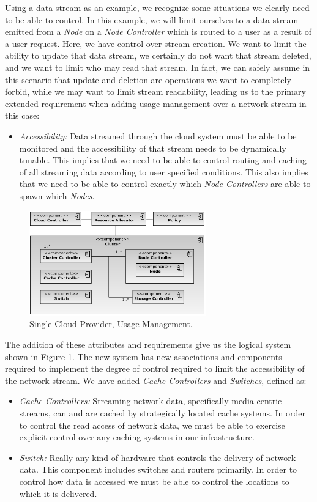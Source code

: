 \documentclass[10pt,letterpaper]{book}
\begin{document}
Using a data stream as an example, we recognize some situations we clearly need to be able to control.  In this example, we will limit ourselves to a data stream emitted from a \textit{Node} on a \textit{Node Controller} which is routed to a user as a result of a user request.  Here, we have control over stream creation.  We want to limit the ability to update that data stream, we certainly do not want that stream deleted, and we want to limit who may read that stream.  In fact, we can safely assume in this scenario that update and deletion are operations we want to completely forbid, while we may want to limit stream readability, leading us to the primary extended requirement when adding usage management over a network stream in this case:

\begin{itemize}
\item \textit{Accessibility:} Data streamed through the cloud system must be able to be monitored and the accessibility of that stream needs to be dynamically tunable.  This implies that we need to be able to control routing and caching of all streaming data according to user specified conditions.  This also implies that we need to be able to control exactly which \textit{Node Controllers} are able to spawn which \textit{Nodes}.
\end{itemize}

\begin{figure}[!t]
\centering
\includegraphics[width=3in]{Single-UM}
\caption{Single Cloud Provider, Usage Management.}
\label{fig:single-um}
\end{figure}

The addition of these attributes and requirements give us the logical system shown in Figure \ref{fig:single-um}.  The new system has new associations and components required to implement the degree of control required to limit the accessibility of the network stream.  We have added \textit{Cache Controllers} and \textit{Switches}, defined as:

\begin{itemize}
\item \textit{Cache Controllers:} Streaming network data, specifically media-centric streams, can and are cached by strategically located cache systems.  In order to control the read access of network data, we must be able to exercise explicit control over any caching systems in our infrastructure.
\item \textit{Switch:} Really any kind of hardware that controls the delivery of network data.  This component includes switches and routers primarily.  In order to control how data is accessed we must be able to control the locations to which it is delivered.
\end{itemize}
\end{document}
